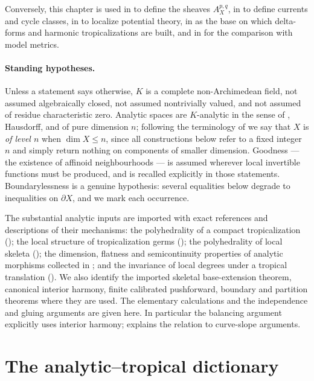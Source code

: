 Conversely, this chapter is used in  to define the
sheaves $A^{p,q}_X$, in  to define currents and
cycle classes, in  to
localize potential theory, in  as the base on which
delta-forms and harmonic tropicalizations are built, and in
 for the comparison with model metrics.

\paragraph{Standing hypotheses.}
Unless a statement says otherwise, $K$ is a complete non-Archimedean field,
not assumed algebraically closed, not assumed nontrivially valued, and not
assumed of residue characteristic zero. Analytic spaces are $K$-analytic in
the sense of , Hausdorff, and of pure dimension $n$;
following the terminology of \cite[\S12.4]{CLD25} we say that $X$ is
\emph{of level $n$} when $\dim X\le n$, since all constructions below refer
to a fixed integer $n$ and simply return nothing on components of smaller
dimension. Goodness --- the existence of affinoid neighbourhoods --- is
assumed wherever local invertible functions must be produced, and is
recalled explicitly in those statements. Boundarylessness is a genuine
hypothesis: several equalities below degrade to inequalities on
$\partial X$, and we mark each occurrence.

The substantial analytic inputs are imported with exact references
and descriptions of their mechanisms: the polyhedrality of a compact
tropicalization (); the local
structure of tropicalization germs (); the
polyhedrality of local skeleta (); the
dimension, flatness and semicontinuity properties of analytic morphisms
collected in ; and the invariance of local
degrees under a tropical translation
(). We also identify the imported
skeletal base-extension theorem, canonical interior harmony, finite
calibrated pushforward, boundary and partition theorems where they are used.
The elementary calculations and the independence and gluing arguments are
given here. In particular the balancing argument explicitly uses interior
harmony;  explains the relation to
curve-slope arguments.

\section{The analytic--tropical dictionary}
\label{sec:trop-dictionary}

